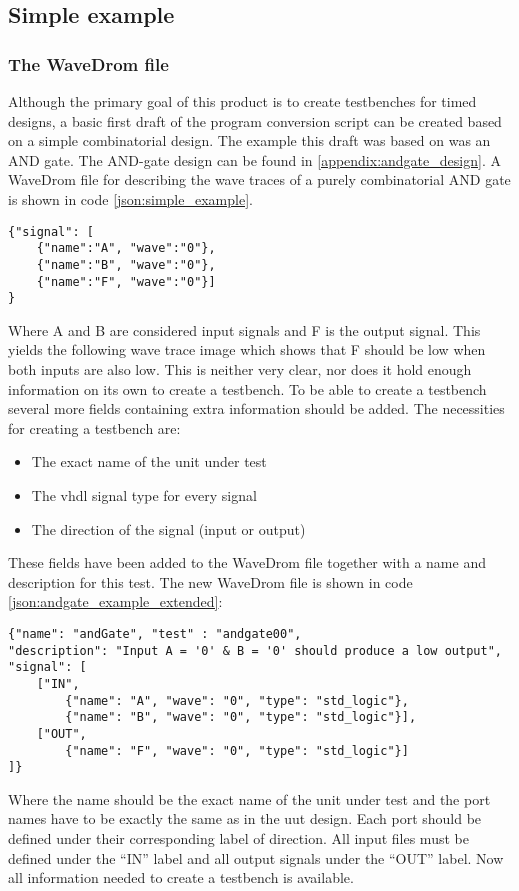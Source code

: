 \subsection{Simple example}
\subsubsection{The WaveDrom file}
Although the primary goal of this product is to create testbenches for timed designs, a basic first draft of the program conversion script can be created based on a simple combinatorial design.
\npar
The example this draft was based on was an AND gate. The AND-gate design can be found in \ref{appendix:andgate_design}.
\npar
A WaveDrom file for describing the wave traces of a purely combinatorial AND gate is shown in code \ref{json:simple_example}.
\begin{lstlisting}[style=json, caption={Standard WaveDrom description for a combinatorial AND-gate}, label={json:simple_example}]
{"signal": [
	{"name":"A", "wave":"0"},
	{"name":"B", "wave":"0"},
	{"name":"F", "wave":"0"}]  
}
\end{lstlisting}\nline
Where A and B are considered input signals and F is the output signal. This yields the following wave trace image which shows that F should be low when both inputs are also low.
\nline
This is neither very clear, nor does it hold enough information on its own to create a testbench.
To be able to create a testbench several more fields containing extra information should be added.
\npar
The necessities for creating a testbench are:
\begin{itemize}
	\item The exact name of the unit under test
	\item The vhdl signal type for every signal
	\item The direction of the signal (input or output)
\end{itemize}\nline
These fields have been added to the WaveDrom file together with a name and description for this test. The new WaveDrom file is shown in code \ref{json:andgate_example_extended}:\newpage
\begin{lstlisting}[style=json, caption={Extended WaveDrom description for a combinatorial AND-gate}, label={json:andgate_example_extended}]
{"name": "andGate", "test" : "andgate00", 
"description": "Input A = '0' & B = '0' should produce a low output", 
"signal": [
	["IN",
		{"name": "A", "wave": "0", "type": "std_logic"},
		{"name": "B", "wave": "0", "type": "std_logic"}],
	["OUT",
		{"name": "F", "wave": "0", "type": "std_logic"}]
]}
\end{lstlisting}\nline
Where the name should be the exact name of the unit under test and the port names have to be exactly the same as in the uut design. Each port should be defined under their corresponding label of direction. All input files must be defined under the “IN” label and all output signals under the “OUT” label. Now all information needed to create a testbench is available.
